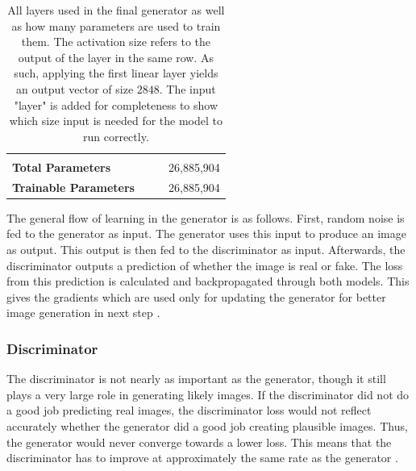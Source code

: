 \documentclass[11pt, fleqn, titlepage]{article}
\newcommand{\1}[1]{\mathds{1}\left[#1\right]}
\begin{document}
\begin{table}[H]
\begin{tabular}{llll}
		                             &                 &       &              \\
		\textbf{Total Parameters}    &                 &       & 26,885,904   \\
		\textbf{Trainable Parameters}&                 &       & 26,885,904   \\  \bottomrule
	\end{tabular}
	\caption{All layers used in the final generator as well as how many parameters are used to train them. The activation size refers to the output of the layer in the same row. As such, applying the first linear layer yields an output vector of size $2848$. The input "layer" is added for completeness to show which size input is needed for the model to run correctly.}
	\label{tab:gan_generator}
\end{table}

The general flow of learning in the generator is as follows. First, random noise is fed to the generator as input. The generator uses this input to produce an image as output. This output is then fed to the discriminator as input. Afterwards, the discriminator outputs a prediction of whether the image is real or fake. The loss from this prediction is calculated and backpropagated through both models. This gives the gradients which are used only for updating the generator for better image generation in next step \cite{developers.google_generator}.

\subsubsection{Discriminator}
The discriminator is not nearly as important as the generator, though it still plays a very large role in generating likely images. If the discriminator did not do a good job predicting real images, the discriminator loss would not reflect accurately whether the generator did a good job creating plausible images. Thus, the generator would never converge towards a lower loss. This means that the discriminator has to improve at approximately the same rate as the generator \cite{developers.google_discriminator, developers.google_training}.
\end{document}

